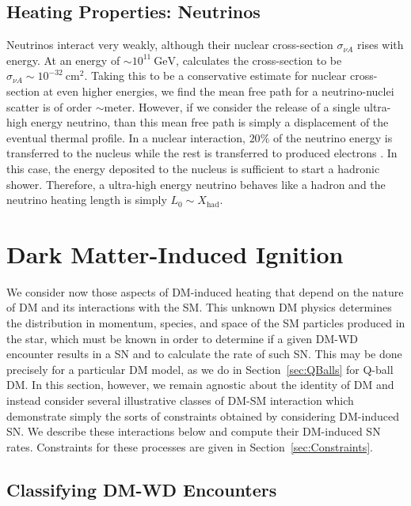 \documentclass[twocolumn,preprintnumbers,amsmath,amssymb,prd, superscriptaddress]{revtex4} %
\newcommand{\GeV}{\text{GeV}}
\newcommand{\cm}{\text{cm}}
\begin{document}
\subsection{Heating Properties: Neutrinos}

Neutrinos interact very weakly, although their nuclear cross-section $\sigma_{\nu A}$ rises with energy.
At an energy of $\sim 10^{11} ~\GeV$, \cite{Formaggio:2013kya} calculates the cross-section to be $\sigma_{\nu A} \sim 10^{-32} ~\cm^2$.
Taking this to be a conservative estimate for nuclear cross-section at even higher energies, we find the mean free path for a neutrino-nuclei scatter is of order $\sim \text{meter}$.
However, if we consider the release of a single ultra-high energy neutrino, than this mean free path is simply a displacement of the eventual thermal profile.
In a nuclear interaction, $20 \%$ of the neutrino energy is transferred to the nucleus while the rest is transferred to produced electrons \cite{Formaggio:2013kya}.
In this case, the energy deposited to the nucleus is sufficient to start a hadronic shower.
Therefore, a ultra-high energy neutrino behaves like a hadron and the neutrino heating length is simply $L_0 \sim X_\text{had}$.

\section{Dark Matter-Induced Ignition}
\label{sec:DMexplode}

We consider now those aspects of DM-induced heating that depend on the nature of DM and its interactions with the SM.
This unknown DM physics determines the distribution in momentum, species, and space of the SM particles produced in the star, which must be known in order to determine if a given DM-WD encounter results in a SN and to calculate the rate of such SN.
This may be done precisely for a particular DM model, as we do in Section~\ref{sec:QBalls} for Q-ball DM.
In this section, however, we remain agnostic about the identity of DM and instead consider several illustrative classes of DM-SM interaction which demonstrate simply the sorts of constraints obtained by considering DM-induced SN.
We describe these interactions below and compute their DM-induced SN rates.
Constraints for these processes are given in Section~\ref{sec:Constraints}.

\subsection{Classifying DM-WD Encounters}
\end{document}
